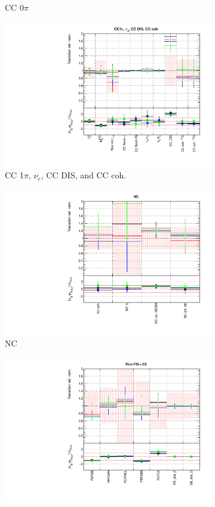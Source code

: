 \begin{figure}[!ht]
\begin{subfigure}{0.49\textwidth}
  \caption{CC 0$\pi$}
\end{subfigure}
\begin{subfigure}{0.49\textwidth}
  \centering
  \includegraphics[width=0.95\linewidth]{figs/detcovbinxsec_2}
  \caption{CC 1$\pi$, $\nu_e$, CC DIS, and CC coh.}
\end{subfigure}
\begin{subfigure}{0.49\textwidth}
  \centering
  \includegraphics[width=0.95\linewidth]{figs/detcovbinxsec_3}
  \caption{NC}
\end{subfigure}
\begin{subfigure}{0.49\textwidth}
  \centering
  \includegraphics[width=0.95\linewidth]{figs/detcovbinxsec_4}

\end{subfigure}
\end{figure}
